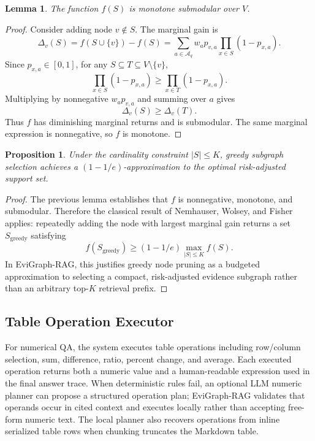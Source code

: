 \documentclass[letterpaper]{article}
\newtheorem{lemma}{Lemma}
\newtheorem{proposition}{Proposition}
\begin{document}
\begin{lemma}
The function \(f(S)\) is monotone submodular over \(V\).
\end{lemma}

\begin{proof}
Consider adding node \(v\notin S\).
The marginal gain is
\[
\Delta_v(S)=f(S\cup\{v\})-f(S)
=\sum_{a\in\mathcal{A}_q} w_a p_{v,a}
\prod_{x\in S}(1-p_{x,a}).
\]
Since \(p_{x,a}\in[0,1]\), for any \(S\subseteq T\subseteq V\setminus\{v\}\),
\[
\prod_{x\in S}(1-p_{x,a})\ge
\prod_{x\in T}(1-p_{x,a}).
\]
Multiplying by nonnegative \(w_a p_{v,a}\) and summing over \(a\) gives
\[
\Delta_v(S)\ge \Delta_v(T).
\]
Thus \(f\) has diminishing marginal returns and is submodular.
The same marginal expression is nonnegative, so \(f\) is monotone.
\end{proof}

\begin{proposition}
Under the cardinality constraint \(|S|\le K\), greedy subgraph selection achieves a \((1-1/e)\)-approximation to the optimal risk-adjusted support set.
\end{proposition}

\begin{proof}
The previous lemma establishes that \(f\) is nonnegative, monotone, and submodular.
Therefore the classical result of Nemhauser, Wolsey, and Fisher~\cite{nemhauser1978analysis} applies: repeatedly adding the node with largest marginal gain returns a set \(S_{\mathrm{greedy}}\) satisfying
\[
f(S_{\mathrm{greedy}})\ge (1-1/e)\max_{|S|\le K} f(S).
\]
In EviGraph-RAG, this justifies greedy node pruning as a budgeted approximation to selecting a compact, risk-adjusted evidence subgraph rather than an arbitrary top-\(K\) retrieval prefix.
\end{proof}

\subsection{Table Operation Executor}

For numerical QA, the system executes table operations including row/column selection, sum, difference, ratio, percent change, and average.
Each executed operation returns both a numeric value and a human-readable expression used in the final answer trace.
When deterministic rules fail, an optional LLM numeric planner can propose a structured operation plan; EviGraph-RAG validates that operands occur in cited context and executes locally rather than accepting free-form numeric text.
The local planner also recovers operations from inline serialized table rows when chunking truncates the Markdown table.
\end{document}
